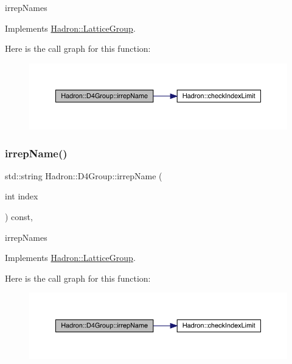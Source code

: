 irrep\+Names 

Implements \mbox{\hyperlink{structHadron_1_1LatticeGroup_a4bc5620218c2a73157e19bc4451fe746}{Hadron\+::\+Lattice\+Group}}.

Here is the call graph for this function\+:
\nopagebreak
\begin{figure}[H]
\begin{center}
\leavevmode
\includegraphics[width=350pt]{de/d5e/structHadron_1_1D4Group_a5f121bd08a7add3ddf660c7e3478cb9e_cgraph}
\end{center}
\end{figure}
\mbox{\label{structHadron_1_1D4Group_a5f121bd08a7add3ddf660c7e3478cb9e}} 
\subsubsection{\texorpdfstring{irrepName()}{irrepName()}\hspace{0.1cm}{\footnotesize\ttfamily [3/3]}}
{\footnotesize\ttfamily std\+::string Hadron\+::\+D4\+Group\+::irrep\+Name (\begin{DoxyParamCaption}\item[{int}]{index }\end{DoxyParamCaption}) const\hspace{0.3cm}{\ttfamily [inline]}, {\ttfamily [virtual]}}

irrep\+Names 

Implements \mbox{\hyperlink{structHadron_1_1LatticeGroup_a4bc5620218c2a73157e19bc4451fe746}{Hadron\+::\+Lattice\+Group}}.

Here is the call graph for this function\+:
\nopagebreak
\begin{figure}[H]
\begin{center}
\leavevmode
\includegraphics[width=350pt]{de/d5e/structHadron_1_1D4Group_a5f121bd08a7add3ddf660c7e3478cb9e_cgraph}
\end{center}
\end{figure}
\mbox{\label{structHadron_1_1D4Group_aeb999dc93b1a1a99ed4ffd53977a163b}} 
